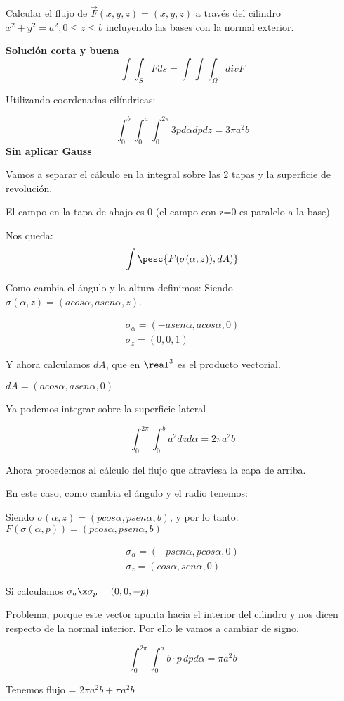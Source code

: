 \begin{problem}[14]
Calcular el flujo de $\overrightarrow{F}(x,y,z) = (x,y,z)$ a través del cilindro $x^2+y^2=a^2, 0\leq z \leq b$ incluyendo las bases con la normal exterior.

\solution

\textbf{Solución corta y buena}
\[\int \int_S Fds = \int \int \int_{\Omega}div F\]

Utilizando coordenadas cilíndricas:

\[\int_0^b \int_0^a\int_0^{2\pi} 3 p d\alpha dp dz = 3\pi a^2b\]
\textbf{Sin aplicar Gauss}

Vamos a separar el cálculo en la integral sobre las 2 tapas y la superficie de revolución.

El campo en la tapa de abajo es 0 (el campo con z=0 es paralelo a la base)

Nos queda: \[\int \pesc{F(\sigma(\alpha,z)),dA)}\]

Como cambia el ángulo y la altura definimos:
Siendo $\sigma(\alpha,z) =(acos\alpha,asen\alpha,z)$.

\begin{gather*}
\sigma_{\alpha} = (-asen\alpha,acos\alpha,0)\\
\sigma_{z} = (0,0,1)
\end{gather*}

Y ahora calculamos $dA$, que en $\real^3$ es el producto vectorial.

$dA = (acos\alpha,asen\alpha,0)$

Ya podemos integrar sobre la superficie lateral

\[\int_0^{2\pi} \int_0^b a^2dzd\alpha = 2\pi a^2b\]


Ahora procedemos al cálculo del flujo que atraviesa la capa de arriba.

En este caso, como cambia el ángulo y el radio tenemos:


Siendo $\sigma(\alpha,z) =(pcos\alpha,psen\alpha,b)$, y por lo tanto: $F(\sigma(\alpha,p)) = (pcos\alpha,psen\alpha,b)$

\begin{gather*}
\sigma_{\alpha} = (-psen\alpha,pcos\alpha,0)\\
\sigma_{z} = (cos\alpha,sen\alpha,0)
\end{gather*}

Si calculamos $\sigma_a\x\sigma_p = (0,0,-p)$

Problema, porque este vector apunta hacia el interior del cilindro y nos dicen respecto de la normal interior. Por ello le vamos a cambiar de signo.

\[\int_0^{2\pi} \int_0^a b\cdot p \,dpd\alpha=\pi a^2b\]

Tenemos flujo = $2\pi a^2b+\pi a^2b$
\end{problem}


